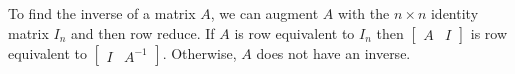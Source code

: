 \documentclass[12pt letter]{report}
\begin{document}
To find the inverse of a matrix $A$, we can augment $A$ with the $n \times n$ identity matrix $I_n$ and then row reduce.
If $A$ is row equivalent to $I_{n}$ then $\begin{bmatrix} A & I \end{bmatrix} $ is row equivalent to $\begin{bmatrix} I
     & A^{-1}\end{bmatrix} $. Otherwise, $A$ does not have an inverse.

\end{document}
